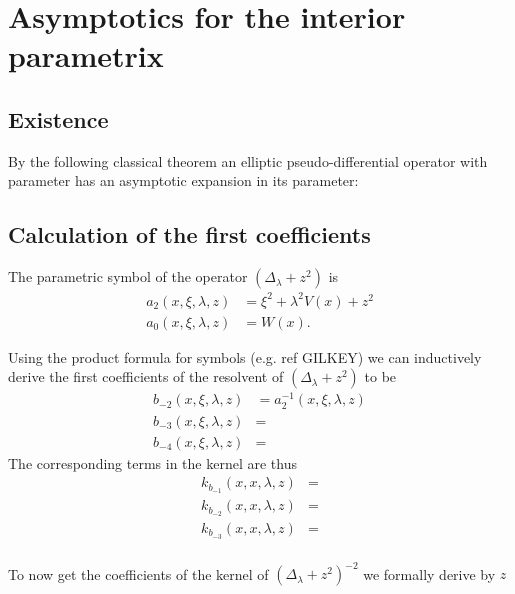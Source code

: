 \section{Asymptotics for the interior parametrix}
\subsection{Existence}
By the following classical theorem an elliptic pseudo-differential operator with
parameter has an asymptotic expansion in its parameter:


\subsection{Calculation of the first coefficients}
The parametric symbol of the operator $(\Delta_\lambda + z^2)$ is
\begin{align}
    a_2(x,\xi,\lambda,z) &= \xi^2 + \lambda^2 V(x) + z^2 \\
    a_0(x,\xi,\lambda,z) &= W(x).
    \label{eqn:symbol}
\end{align}

Using the product formula for symbols (e.g. ref GILKEY) we can inductively
derive the first coefficients of the resolvent of $(\Delta_\lambda + z^2)$ to be
\begin{align}
    b_{-2}(x,\xi,\lambda,z) &= a_2^{-1}(x,\xi,\lambda,z) \\
    b_{-3}(x,\xi,\lambda,z) &= \\
    b_{-4}(x,\xi,\lambda,z) &=
    \label{eqn:coeff-symbol}
\end{align}
The corresponding terms in the kernel are thus
\begin{align}
    k_{b_{-1}}(x,x,\lambda,z) &= \\
    k_{b_{-2}}(x,x,\lambda,z) &= \\
    k_{b_{-3}}(x,x,\lambda,z) &= \\
    \label{eqn:coeff-kernel}
\end{align}

To now get the coefficients of the kernel of $(\Delta_\lambda + z^2)^{-2}$ we
formally derive by $z$


